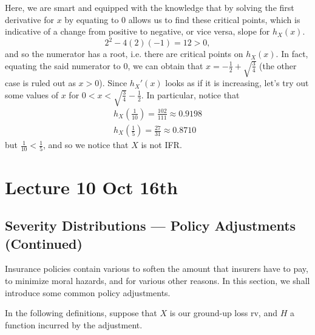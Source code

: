 \documentclass[notoc,notitlepage]{tufte-book}
\begin{document}
\begin{solution}
\begin{enumerate}
{      Here, we are smart and equipped with the knowledge that by solving the first derivative for $x$ by equating to $0$ allows us to find these critical points, which is indicative of a change from positive to negative, or vice versa, slope for $h_X(x)$.}
      \begin{equation*}
        2^2 - 4(2)(-1) = 12 > 0,
      \end{equation*}
      and so the numerator has a root, i.e. there are critical points on $h_X(x)$. In fact, equating the said numerator to $0$, we can obtain that $x = - \frac{1}{2} + \sqrt{\frac{3}{4}}$ (the other case is ruled out as $x > 0$). Since $h_X'(x)$ looks as if it is increasing, let's try out some values of $x$ for $0 < x < \sqrt{\frac{3}{4}} - \frac{1}{2}$. In particular, notice that
      \begin{gather*}
        h_X \left( \frac{1}{10} \right) = \frac{102}{111} \approx 0.9198 \\
        h_X \left( \frac{1}{5} \right) = \frac{27}{31} \approx 0.8710
      \end{gather*}
      but $\frac{1}{10} < \frac{1}{5}$, and so we notice that $X$ is not IFR.
  \end{enumerate}
\end{solution}




\chapter{Lecture 10 Oct 16th}%
\label{chp:lecture_10_oct_16th}

\section{Severity Distributions --- Policy Adjustments (Continued)}%
\label{sec:severity_distributions_policy_adjustments_continued}

Insurance policies contain various  to soften the amount that insurers have to pay, to minimize moral hazards, and for various other reasons. In this section, we shall introduce some common policy adjustments.

In the following definitions, suppose that $X$ is our ground-up loss rv, and $H$ a function incurred by the adjustment.
\end{document}

